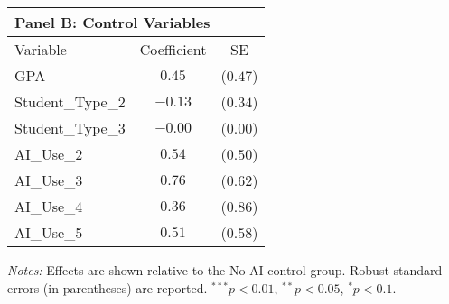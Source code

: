 \begin{table}[!htbp]
\begin{tabular}{lcc}
\multicolumn{3}{l}{\textbf{Panel B: Control Variables}} \\
\hline\hline
Variable & Coefficient & SE \\
\hline
GPA & $0.45$ & ($0.47$) \\
Student_Type_2 & $-0.13$ & ($0.34$) \\
Student_Type_3 & $-0.00$ & ($0.00$) \\
AI_Use_2 & $0.54$ & ($0.50$) \\
AI_Use_3 & $0.76$ & ($0.62$) \\
AI_Use_4 & $0.36$ & ($0.86$) \\
AI_Use_5 & $0.51$ & ($0.58$) \\
\hline
\end{tabular}
\begin{tablenotes}
\small
\item \textit{Notes:} Effects are shown relative to the No AI control group. Robust standard errors (in parentheses) are reported. $^{***}p<0.01$, $^{**}p<0.05$, $^{*}p<0.1$.
\end{tablenotes}
\end{table}